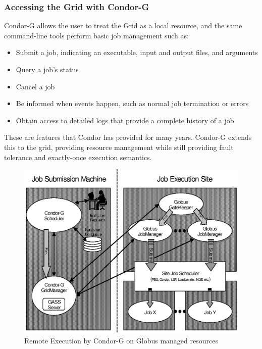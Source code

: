 \subsubsection{\label{sec:Grid-Access}Accessing the Grid with Condor-G}

Condor-G allows the user to treat the Grid as a local resource,
and the same command-line tools perform basic job management such as:
\begin{itemize}
\item Submit a job, indicating an executable, input and output files,
and arguments
\item Query a job's status
\item Cancel a job
\item Be informed when events happen,
such as normal job termination or errors
\item Obtain access to detailed logs that provide a complete history of a job
\end{itemize}

These are features that Condor has provided for many years.
Condor-G extends this to the grid,
providing resource management 
while still providing fault tolerance and exactly-once execution 
semantics. 

\begin{figure}[hbt]
\centering
\includegraphics{grids/gfig1.eps}
\caption{\label{fig:condorg}Remote Execution by Condor-G on Globus managed resources}
\end{figure}

